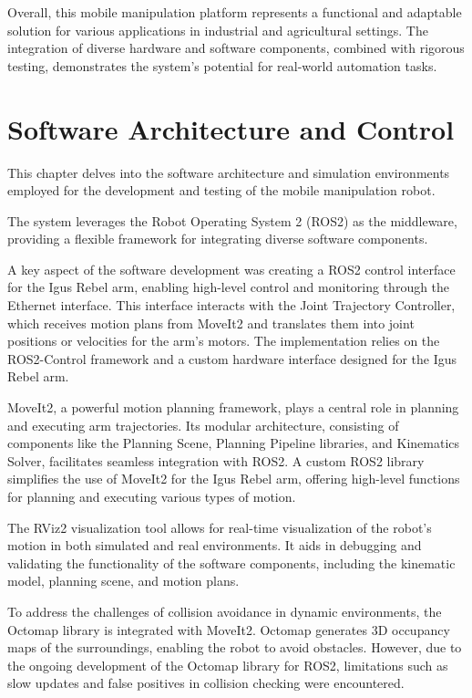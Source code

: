 Overall, this mobile manipulation platform represents a functional and adaptable solution for various applications 
in industrial and agricultural settings. The integration of diverse hardware and software components, combined with
rigorous testing, demonstrates the system's potential for real-world automation tasks.

\section{Software Architecture and Control}

This chapter delves into the software architecture and simulation environments employed for the development
and testing of the mobile manipulation robot.

The system leverages the Robot Operating System 2 (ROS2) as the middleware, providing a flexible framework for
integrating diverse software components.

A key aspect of the software development was creating a ROS2 control interface for the Igus Rebel arm, enabling 
high-level control and monitoring through the Ethernet interface. This interface interacts with the Joint Trajectory 
Controller, which receives motion plans from MoveIt2 and translates them into joint positions or velocities for 
the arm's motors. The implementation relies on the ROS2-Control framework and a custom hardware interface designed
for the Igus Rebel arm.

MoveIt2, a powerful motion planning framework, plays a central role in planning and executing arm trajectories. 
Its modular architecture, consisting of components like the Planning Scene, Planning Pipeline libraries, and 
Kinematics Solver, facilitates seamless integration with ROS2. A custom ROS2 library simplifies the use of 
MoveIt2 for the Igus Rebel arm, offering high-level functions for planning and executing various types of motion.

The RViz2 visualization tool allows for real-time visualization of the robot's motion in both simulated and real 
environments. It aids in debugging and validating the functionality of the software components, including the 
kinematic model, planning scene, and motion plans.

To address the challenges of collision avoidance in dynamic environments, the Octomap library is integrated with
MoveIt2. Octomap generates 3D occupancy maps of the surroundings, enabling the robot to avoid obstacles. 
However, due to the ongoing development of the Octomap library for ROS2, limitations such as slow updates and 
false positives in collision checking were encountered.

